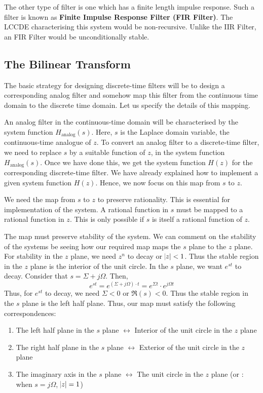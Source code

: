 \documentclass{article}
\theoremstyle{definition}
\begin{document}
The other type of filter is one which has a finite length impulse response. Such a filter is known as \textbf{Finite Impulse Response Filter (FIR Filter)}. The LCCDE characterising this system would be non-recursive. Unlike the IIR Filter, an FIR Filter would be unconditionally stable.  

\subsection{The Bilinear Transform}

The basic strategy for designing discrete-time filters will be to design a corresponding analog filter and somehow map this filter from the continuous time domain to the discrete time domain. Let us specify the details of this mapping. \smallskip

An analog filter in the continuous-time domain will be characterised by the system function $H_{\text{analog}}(s)$. Here, $s$ is the Laplace domain variable, the continuous-time analogue of $z$. To convert an analog filter to a discrete-time filter, we need to replace $s$ by a suitable function of $z$, in the system function $H_{\text{analog}}(s)$. Once we have done this, we get the system function $H(z)$ for the corresponding discrete-time filter. We have already explained how to implement a given system function $H(z)$. Hence, we now focus on this map from $s$ to $z$. \smallskip

We need the map from $s$ to $z$ to preserve rationality. This is essential for implementation of the system. A rational function in $s$ must be mapped to a rational function in $z$. This is only possible if $s$ is itself a rational function of $z$. \smallskip

The map must preserve stability of the system. We can comment on the stability of the systems be seeing how our required map maps the $s$ plane to the $z$ plane. For stability in the $z$ plane, we need $z^n$ to decay or $\abs{z} < 1$. Thus the stable region in the $z$ plane is the interior of the unit circle. In the $s$ plane, we want $e^{st}$ to decay. Consider that $s = \Sigma + j\Omega$. Then, 
\[
    e^{st} = e^{(\Sigma + j \Omega) \cdot t} = e^{\Sigma t} \cdot e^{j \Omega t}
\]
Thus, for $e^{st}$ to decay, we need $\Sigma < 0$ or $\Re{(s)} < 0$. Thus the stable region in the $s$ plane is the left half plane. Thus, our map must satisfy the following correspondences:
\begin{enumerate}
    \item The left half plane in the $s$ plane $\longleftrightarrow$ Interior of the unit circle in the $z$ plane
    \item The right half plane in the $s$ plane $\longleftrightarrow$ Exterior of the unit circle in the $z$ plane
    \item The imaginary axis in the $s$ plane $\longleftrightarrow$ The unit circle in the $z$ plane (or : when $s = j\Omega$, $\abs{z} = 1$)
\end{enumerate}
\end{document}
